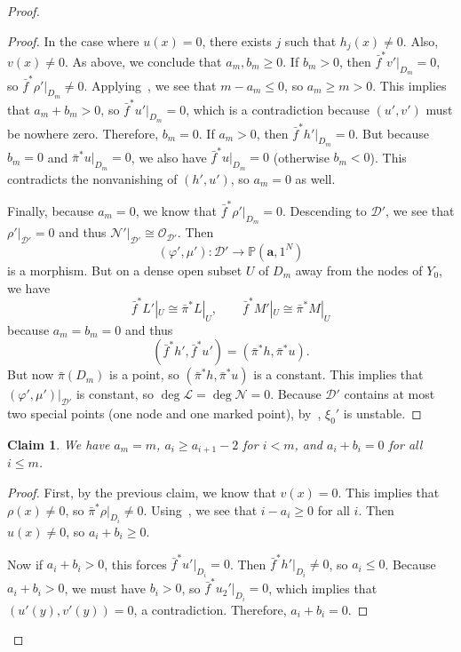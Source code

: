 \documentclass{amsart}
\newtheorem{claim}[thm]{Claim}
\theoremstyle{definition}
\theoremstyle{remark}
\theoremstyle{plain}
\theoremstyle{definition}
\theoremstyle{remark}
\renewcommand{\P}{\mathbb{P}}
\newcommand{\ba}{\mathbf{a}}
\newcommand{\mc}[1]{\mathcal{#1}}
\newcommand{\1}{\mathbf{1}}
\newcommand{\2}{\mathbf{2}}
\newcommand{\3}{\mathbf{3}}
\begin{document}
\begin{proof}
\begin{proof}
        In the case where $u(x) = 0$, there exists $j$ such that $h_j(x) \neq 0$. Also, $v(x) \neq 0$. As above, we conclude that $a_m, b_m \geq 0$. If $b_m > 0$, then $\bar{f}^* v'|_{D_m} = 0$, so $\bar{f}^* \rho'|_{D_m} \neq 0$. Applying~, we see that $m - a_m \leq 0$, so $a_m \geq m > 0$. This implies that $a_m + b_m > 0$, so $\bar{f}^* u'|_{D_m} = 0$, which is a contradiction because $(u',v')$ must be nowhere zero. Therefore, $b_m = 0$. If $a_m > 0$, then $\bar{f}^* h'|_{D_m} = 0$. But because $b_m = 0$ and $\bar{\pi}^*u|_{D_m} = 0$, we also have $\bar{f}^* u|_{D_m} = 0$ (otherwise $b_m < 0$). This contradicts the nonvanishing of $(h',u')$, so $a_m = 0$ as well.
        
        Finally, because $a_m = 0$, we know that $\bar{f}^*\rho'|_{D_m} = 0$. Descending to $\mc{D}'$, we see that $\rho'|_{\mc{D}'} = 0$ and thus $\mc{N}'|_{\mc{D}'} \cong \mc{O}_{\mc{D}'}$. Then
        \[ (\varphi', \mu') \colon \mc{D}' \to \P(\ba,1^N) \]
        is a morphism. But on a dense open subset $U$ of $D_m$ away from the nodes of $Y_0$, we have
        \[ \bar{f}^* L'|_U \cong \bar{\pi}^*L |_U, \qquad \bar{f}^* M'|_U \cong \bar{\pi}^*M |_U \]
        because $a_m = b_m = 0$ and thus 
        \[ (\bar{f}^* h', \bar{f}^*u') = (\bar{\pi}^* h, \bar{\pi}^* u). \]
        But now $\bar{\pi}(D_m)$ is a point, so $(\bar{\pi}^* h, \bar{\pi}^* u)$ is a constant. This implies that $(\varphi',\mu')|_{\mc{D}'}$ is constant, so $\deg \mc{L} = \deg \mc{N} = 0$. Because $\mc{D}'$ contains at most two special points (one node and one marked point), by~, $\xi_0'$ is unstable.
    \end{proof}

    \begin{claim}
        We have $a_m = m$, $a_i \geq a_{i+1}-2$ for $i < m$, and $a_i + b_i = 0$ for all $i \leq m$.
    \end{claim}
    
    \begin{proof}
        First, by the previous claim, we know that $v(x) = 0$. This implies that $\rho(x) \neq 0$, so $\bar{\pi}^* \rho|_{D_i} \neq 0$. Using~, we see that $i - a_i \geq 0$ for all $i$. Then $u(x) \neq 0$, so $a_i + b_i \geq 0$.

        Now if $a_i + b_i > 0$, this forces $\bar{f}^* u'|_{D_i} = 0$. Then $\bar{f}^* h'|_{D_i} \neq 0$, so $a_i \leq 0$. Because $a_i + b_i > 0$, we must have $b_i > 0$, so $\bar{f}^* u_2'|_{D_i} = 0$, which implies that $(u'(y), v'(y)) = 0$, a contradiction. Therefore, $a_i + b_i = 0$.


\end{proof}
\end{proof}
\end{document}
